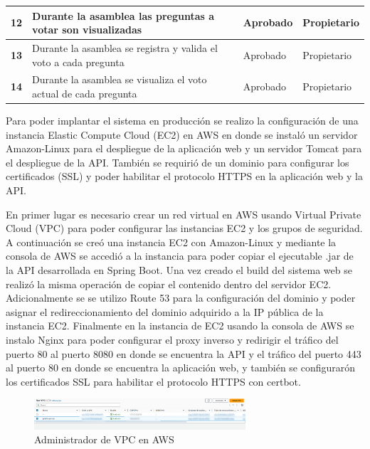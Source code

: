 \begin{footnotesize}
\begin{spacing}{1}
\begin{center}
\begin{longtable}{ |>{\bfseries}l|p{}|l|l| }
        \hline
        12 & Durante la asamblea las preguntas a votar son visualizadas & Aprobado & Propietario\\
        \hline
        13 & Durante la asamblea se registra y valida el voto a cada pregunta & Aprobado & Propietario\\
        \hline
        14 & Durante la asamblea se visualiza el voto actual de cada pregunta & Aprobado & Propietario\\
        \hline
    \end{longtable}\label{tab:pruebas-aceptacion-3}
    \end{center}
\end{spacing}
\end{footnotesize}

Para poder implantar el sistema en producción se realizo la configuración de una instancia Elastic Compute Cloud (EC2) en AWS en donde se instaló un servidor Amazon-Linux para el despliegue de la aplicación web y un servidor Tomcat para el despliegue de la API.
También se requirió de un dominio para configurar los certificados (SSL) y poder habilitar el protocolo HTTPS en la aplicación web y la API.

En primer lugar es necesario crear un red virtual en AWS usando Virtual Private Cloud (VPC) para poder configurar las instancias EC2 y los grupos de seguridad.
A continuación se creó una instancia EC2 con Amazon-Linux y mediante la consola de AWS se accedió a la instancia para poder copiar el ejecutable .jar de la API desarrollada en Spring Boot.
Una vez creado el build del sistema web se realizó la misma operación de copiar el contenido dentro del servidor EC2.
Adicionalmente se se utilizo Route 53 para la configuración del dominio y poder asignar el redireccionamiento del dominio adquirido a la IP pública de la instancia EC2.
Finalmente en la instancia de EC2 usando la consola de AWS se instalo Nginx para poder configurar el proxy inverso y redirigir el tráfico del puerto 80 al puerto 8080 en donde se encuentra la API y el tráfico del puerto 443 al puerto 80 en donde se encuentra la aplicación web, y también se configurarón los certificados SSL para habilitar el protocolo HTTPS con certbot.

\begin{figure}[H]
    \centering
    \includegraphics[width=0.7\textwidth]{resources/images/aws-vpc}
    \caption{Administrador de VPC en AWS}
    \label{fig:vpc}
\end{figure}

